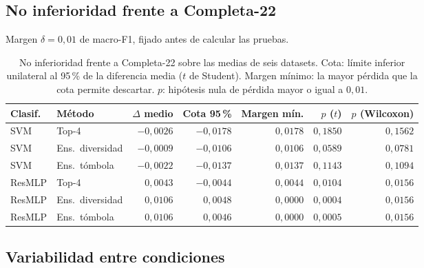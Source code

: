 \documentclass[11pt,a4paper]{article}
\begin{document}
\subsection{No inferioridad frente a Completa-22}

\noindent Margen $\delta=0{,}01$ de macro-F1, fijado antes de calcular las pruebas.

\begin{table}[H]
\centering\fontsize{8}{10}\selectfont\setlength{\tabcolsep}{3.0pt}
\caption{No inferioridad frente a Completa-22 sobre las medias de seis datasets. Cota: límite inferior unilateral al 95\,\% de la diferencia media ($t$ de Student). Margen mínimo: la mayor pérdida que la cota permite descartar. $p$: hipótesis nula de pérdida mayor o igual a $0{,}01$.}
\label{tab:sel-noninferiority}
\begin{tabular}{@{}llrrrrr@{}}
\toprule
Clasif. & Método & $\Delta$ medio & Cota 95\,\% & Margen mín. & $p$ ($t$) & $p$ (Wilcoxon) \\
\midrule
SVM & Top-4 & $-0{,}0026$ & $-0{,}0178$ & $0{,}0178$ & $0{,}1850$ & $0{,}1562$ \\
SVM & Ens.\ diversidad & $-0{,}0009$ & $-0{,}0106$ & $0{,}0106$ & $0{,}0589$ & $0{,}0781$ \\
SVM & Ens.\ tómbola & $-0{,}0022$ & $-0{,}0137$ & $0{,}0137$ & $0{,}1143$ & $0{,}1094$ \\
ResMLP & Top-4 & $0{,}0043$ & $-0{,}0044$ & $0{,}0044$ & $0{,}0104$ & $0{,}0156$ \\
ResMLP & Ens.\ diversidad & $0{,}0106$ & $0{,}0048$ & $0{,}0000$ & $0{,}0004$ & $0{,}0156$ \\
ResMLP & Ens.\ tómbola & $0{,}0106$ & $0{,}0046$ & $0{,}0000$ & $0{,}0005$ & $0{,}0156$ \\
\bottomrule
\end{tabular}
\end{table}

\subsection{Variabilidad entre condiciones}
\end{document}
